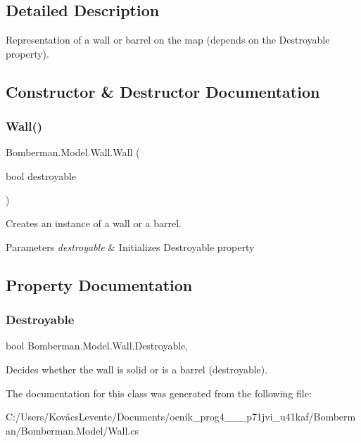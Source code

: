 \subsection{Detailed Description}
Representation of a wall or barrel on the map (depends on the Destroyable property). 



\subsection{Constructor \& Destructor Documentation}
\mbox{\label{class_bomberman_1_1_model_1_1_wall_a32c29562460df6afe031561e0f820816}} 
\subsubsection{\texorpdfstring{Wall()}{Wall()}}
{\footnotesize\ttfamily Bomberman.\+Model.\+Wall.\+Wall (\begin{DoxyParamCaption}\item[{bool}]{destroyable }\end{DoxyParamCaption})\hspace{0.3cm}{\ttfamily [inline]}}



Creates an instance of a wall or a barrel. 


\begin{DoxyParams}{Parameters}
{\em destroyable} & Initializes Destroyable property\\
\hline
\end{DoxyParams}


\subsection{Property Documentation}
\mbox{\label{class_bomberman_1_1_model_1_1_wall_a312f4910b33fded83e14ccc2afe34f91}} 
\subsubsection{\texorpdfstring{Destroyable}{Destroyable}}
{\footnotesize\ttfamily bool Bomberman.\+Model.\+Wall.\+Destroyable\hspace{0.3cm}{\ttfamily [get]}, {\ttfamily [set]}}



Decides whether the wall is solid or is a barrel (destroyable). 



The documentation for this class was generated from the following file\+:\begin{DoxyCompactItemize}
\item 
C\+:/\+Users/\+Kovács\+Levente/\+Documents/oenik\+\_\+prog4\+\_\+\_\+\_\+p71jvi\+\_\+u41kaf/\+Bomberman/\+Bomberman.\+Model/Wall.\+cs\end{DoxyCompactItemize}
